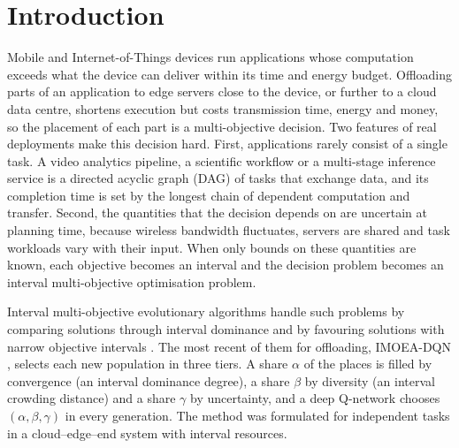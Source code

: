 \section{Introduction}
\label{sec:intro}

Mobile and Internet-of-Things devices run applications whose computation exceeds what the device can deliver within
its time and energy budget. Offloading parts of an application to edge servers close to the device, or further to a
cloud data centre, shortens execution but costs transmission time, energy and money, so the placement of each part is a
multi-objective decision. Two features of real deployments make this decision hard. First, applications rarely consist
of a single task. A video analytics pipeline, a scientific workflow or a multi-stage inference service is a directed
acyclic graph (DAG) of tasks that exchange data, and its completion time is set by the longest chain of dependent
computation and transfer. Second, the quantities that the decision depends on are uncertain at planning time, because
wireless bandwidth fluctuates, servers are shared and task workloads vary with their input. When only bounds on these
quantities are known, each objective becomes an interval and the decision problem becomes an interval multi-objective
optimisation problem.

Interval multi-objective evolutionary algorithms handle such problems by comparing solutions through interval
dominance and by favouring solutions with narrow objective intervals
\citep{limbourg2005ipmoea,jin2023imoeadawn,cui2024imeaied}. The most recent of them for offloading, IMOEA-DQN
\citep{jin2026imoeadqn}, selects each new population in three tiers. A share $\alpha$ of the places is filled by
convergence (an interval dominance degree), a share $\beta$ by diversity (an interval crowding distance) and a share
$\gamma$ by uncertainty, and a deep Q-network chooses $(\alpha, \beta, \gamma)$ in every generation. The method was
formulated for independent tasks in a cloud--edge--end system with interval resources.

